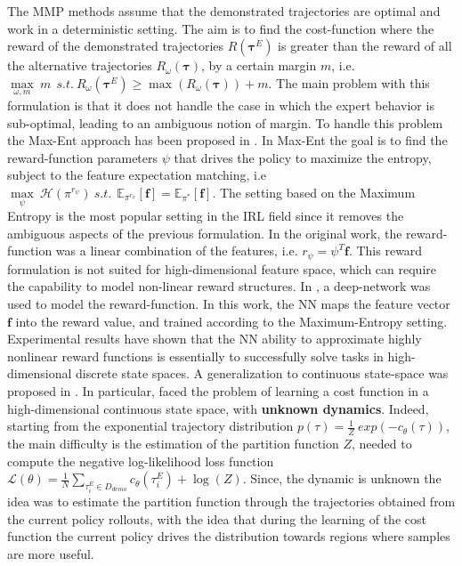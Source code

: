 The MMP methods assume that the demonstrated trajectories are optimal and work in a deterministic setting. The aim is to find the cost-function where the reward of the demonstrated trajectories $R(\boldsymbol{\tau}^{E})$ is greater than the reward of all the alternative trajectories $R_{\omega}(\boldsymbol{\tau})$, by a certain margin $m$, i.e. $ \underset{\omega, m}{\max} \ m \  \ s.t. \ R_{\omega}(\boldsymbol{\tau}^{E}) \geq \max (R_{\omega}(\boldsymbol{\tau})) + m$. The main problem with this formulation is that it does not handle the case in which the expert behavior is sub-optimal, leading to an ambiguous notion of margin. To handle this problem the Max-Ent approach has been proposed in \cite{ziebart2008maximum_entropy}. In Max-Ent the goal is to find the reward-function parameters $\psi$ that drives the policy to maximize the entropy, subject to the feature expectation matching, i.e $\underset{\psi}{\max} \ \mathcal{H}(\pi^{r_{\psi}}) \ s.t. \ \ \mathbb{E}_{\pi^{r_{\psi}}}[\mathbf{f}] = \mathbb{E}_{\pi^{*}}[\mathbf{f}]$. The setting based on the Maximum Entropy is the most popular setting in the IRL field since it removes the ambiguous aspects of the previous formulation. In the original work, the reward-function was a linear combination of the features, i.e. $r_{\psi} = \psi^T \mathbf{f}$. This reward formulation is not suited for high-dimensional feature space, which can require the capability to model non-linear reward structures. In \cite{wulfmeier2015deep_inverse_rl}, a deep-network was used to model the reward-function. In this work, the NN maps the feature vector $\textbf{f}$ into the reward value, and trained according to the Maximum-Entropy setting. Experimental results have shown that the NN ability to approximate highly nonlinear reward functions is essentially to successfully solve tasks in high-dimensional discrete state spaces. A generalization to continuous state-space was proposed in \cite{finn2016guided_cost_learning}. In particular, \cite{finn2016guided_cost_learning} faced the problem of learning a cost function in a high-dimensional continuous state space, with \textbf{unknown dynamics}. Indeed, starting from the exponential trajectory distribution $p(\tau) = \frac{1}{Z} \ exp(-c_{\theta}(\tau))$, the main difficulty is the estimation of the partition function $Z$, needed to compute the negative log-likelihood loss function $\mathcal{L}(\theta) = \frac{1}{N} \underset{\tau^{E}_{i} \in D_{demo}}{\sum} c_{\theta}(\tau^{E}_{i}) + \log(Z)$. Since, the dynamic is unknown the idea was to estimate the partition function through the trajectories obtained from the current policy rollouts, with the idea that during the learning of the cost function the current policy drives the distribution towards regions where samples are more useful.%
